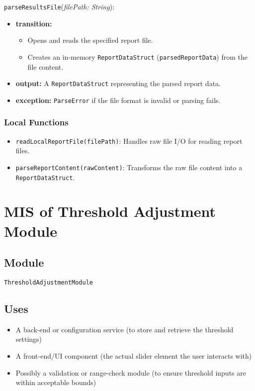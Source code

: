 \documentclass[12pt, titlepage]{article}
\begin{document}
\noindent \texttt{parseResultsFile}(\textit{filePath: String}):
\begin{itemize}
    \item \textbf{transition:}
    \begin{itemize}
        \item Opens and reads the specified report file.
        \item Creates an in-memory \texttt{ReportDataStruct} (\texttt{parsedReportData}) from the file content.
    \end{itemize}
    \item \textbf{output:} A \texttt{ReportDataStruct} representing the parsed report data.
    \item \textbf{exception:} \texttt{ParseError} if the file format is invalid or parsing fails.
\end{itemize}

\subsubsection{Local Functions}

\begin{itemize}
    \item \texttt{readLocalReportFile(filePath)}: Handles raw file I/O for reading report files.
    \item \texttt{parseReportContent(rawContent)}: Transforms the raw file content into a \texttt{ReportDataStruct}.
\end{itemize}

\section{MIS of Threshold Adjustment Module} \label{mThreshold}


\subsection{Module}

\texttt{ThresholdAdjustmentModule}

\subsection{Uses}

\begin{itemize}
    \item A back-end or configuration service (to store and retrieve the threshold settings)
    \item A front-end/UI component (the actual slider element the user interacts with)
    \item Possibly a validation or range-check module (to ensure threshold inputs are within acceptable bounds)
\end{itemize}
\end{document}
